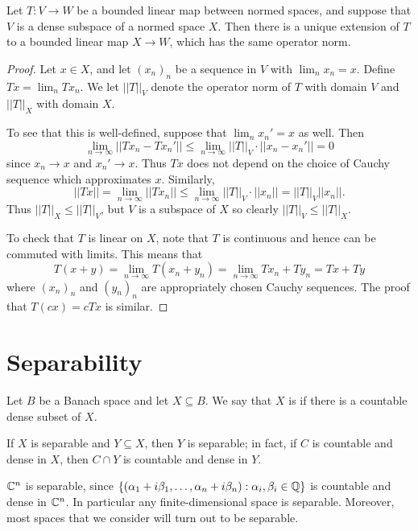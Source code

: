 \begin{lemma}\label{linear extension}
Let $T: V \to W$ be a bounded linear map between normed spaces, and suppose that $V$ is a dense subspace of a normed space $X$.
Then there is a unique extension of $T$ to a bounded linear map $X \to W$, which has the same operator norm.
\end{lemma}
\begin{proof}
Let $x \in X$, and let ${(x_{n})}_{n}$ be a sequence in $V$ with $\lim_{n} x_{n} = x$.
Define $Tx = \lim_{n} Tx_{n}$.
We let $||T||_V$ denote the operator norm of $T$ with domain $V$ and $||T||_X$ with domain $X$.

To see that this is well-defined, suppose that $\lim_{n} x_{n}' = x$ as well. Then
\[\lim_{n \to \infty} ||Tx_{n} - Tx_{n}'|| \leq \lim_{n \to \infty} ||T||_{V} \cdot||x_{n} - x_{n}'|| = 0\]
since $x_{n} \to x$ and $x_{n}' \to x$.
Thus $Tx$ does not depend on the choice of Cauchy sequence which approximates $x$.
Similarly,
\[||Tx|| = \lim_{n \to \infty} ||Tx_{n}|| \leq \lim_{n \to \infty} ||T||_{V} \cdot||x_{n}|| = ||T||_{V} ||x_{n}||.\]
Thus $||T||_{X} \leq ||T||_V$, but $V$ is a subspace of $X$ so clearly $||T||_{V} \leq ||T||_X$.

To check that $T$ is linear on $X$, note that $T$ is continuous and hence can be commuted with limits. This means that
\[T(x + y) = \lim_{n \to \infty} T(x_{n} + y_{n}) = \lim_{n \to \infty} Tx_{n} + Ty_{n} = Tx + Ty\]
where ${(x_{n})}_{n}$ and ${(y_{n})}_{n}$ are appropriately chosen Cauchy sequences.
The proof that $T(cx) = cTx$ is similar.
\end{proof}

\section{Separability}
\begin{definition}
Let $B$ be a Banach space and let $X \subseteq B$. We say that $X$ is  if there is a countable dense subset of $X$.
\end{definition}

\begin{subsec}
If $X$ is separable and $Y \subseteq X$, then $Y$ is separable; in fact, if $C$ is countable and dense in $X$, then $C \cap Y$ is countable and dense in $Y$.
\end{subsec}

\begin{example}
$\mathbb{C}^n$ is separable, since $\{(\alpha_1 + i\beta_1, \dots, \alpha_{n} + i \beta_{n}): \alpha_i, \beta_{i} \in \mathbb{Q}\}$ is countable and dense in $\mathbb{C}^n$.
In particular any finite-dimensional space is separable. Moreover, most spaces that we consider will turn out to be separable.
\end{example}


